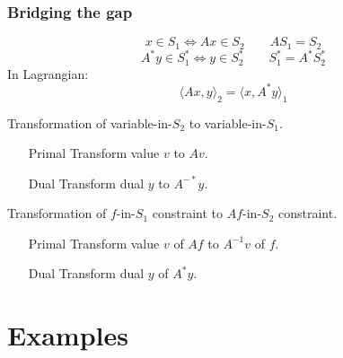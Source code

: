\documentclass{beamer}
\begin{document}
  \begin{frame}
    \frametitle{Bridging the gap}
    \[ x \in S_1 \Leftrightarrow Ax \in S_2 \qquad AS_1 = S_2 \]
    \[ A^* y \in S_1^* \Leftrightarrow y \in S_2^* \qquad S_1^* = A^* S_2^* \]
    In Lagrangian:
    \[ \langle Ax, y \rangle_2 = \langle x, A^* y \rangle_1 \]
    \vspace{-0.5cm}
    \begin{block}{Transformation of variable-in-$S_2$ to variable-in-$S_1$.}
%
      \begin{enumerate}
        \item[Primal] Transform value $v$ to $Av$.
        \item[Dual] Transform dual $y$ to $A^{-*}y$.
      \end{enumerate}
    \end{block}
    \begin{block}{Transformation of $f$-in-$S_1$ constraint to $Af$-in-$S_2$ constraint.}

      \begin{enumerate}
        \item[Primal] Transform value $v$ of $Af$ to $A^{-1}v$ of $f$.
        \item[Dual] Transform dual $y$ of $A^*y$.
      \end{enumerate}
    \end{block}
  \end{frame}

\section{Examples}
\end{document}
